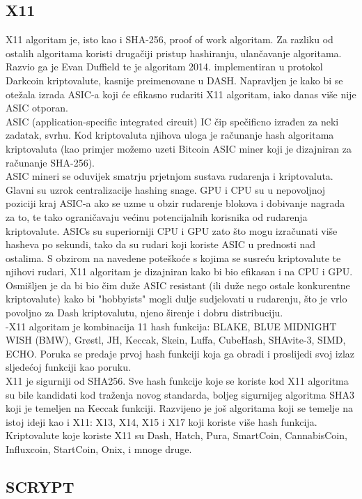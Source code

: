 \documentclass[12pt]{article}
\providecommand\phantomsection{}
\begin{document}
\pagebreak

\subsection{X11}
X11 algoritam je, isto kao i SHA-256, proof of work algoritam. Za razliku od ostalih algoritama koristi drugačiji pristup hashiranju, ulančavanje algoritama. Razvio ga je Evan Duffield te je algoritam 2014. implementiran u protokol Darkcoin kriptovalute, kasnije preimenovane u DASH.
Napravljen je kako bi se otežala izrada ASIC-a koji će efikasno rudariti X11 algoritam, iako danas više nije ASIC otporan.\\
ASIC (application-specific integrated circuit) IC čip spečificno izrađen za neki zadatak, svrhu. Kod kriptovaluta njihova uloga je računanje hash algoritama kriptovaluta (kao primjer možemo uzeti Bitcoin ASIC miner koji je dizajniran za računanje SHA-256). \\
ASIC mineri se oduvijek smatrju prjetnjom sustava rudarenja i kriptovaluta. Glavni su uzrok centralizacije hashing snage. GPU i CPU su u nepovoljnoj poziciji kraj ASIC-a ako se uzme u obzir rudarenje blokova i dobivanje nagrada za to, te tako ograničavaju većinu potencijalnih korisnika od rudarenja kriptovalute. 
ASICs su superiorniji CPU i GPU zato što mogu izračunati više hasheva po sekundi, tako da su rudari koji koriste ASIC u prednosti nad ostalima.
S obzirom na navedene poteškoće s kojima se susreću kriptovalute te njihovi rudari, X11 algoritam je dizajniran kako bi bio efikasan i na CPU i GPU. Osmišljen je da bi bio čim duže ASIC resistant (ili duže nego ostale konkurentne kriptovalute) kako bi "hobbyists" mogli dulje sudjelovati u rudarenju, što je vrlo povoljno za Dash kriptovalutu, njeno širenje i dobru distribuciju. \\  
-X11 algoritam je kombinacija 11 hash funkcija: BLAKE, BLUE MIDNIGHT WISH (BMW), Grøstl, JH, Keccak, Skein, Luffa, CubeHash, SHAvite-3, SIMD, ECHO. Poruka se predaje prvoj hash funkciji koja ga obradi i proslijedi svoj izlaz sljedećoj funkciji kao poruku.\\
X11 je sigurniji od SHA256. Sve hash funkcije koje se koriste kod X11 algoritma su bile kandidati kod traženja novog standarda, boljeg sigurnijeg algoritma SHA3 koji je temeljen na Keccak funkciji.
Razvijeno je još algoritama koji se temelje na istoj ideji kao i X11: X13, X14, X15 i X17 koji koriste više hash funkcija.\\
Kriptovalute koje koriste X11 su Dash, Hatch, Pura, SmartCoin, CannabisCoin, Influxcoin, StartCoin, Onix, i mnoge druge.\cite{x11-description}


\pagebreak
\subsection{SCRYPT}


\phantomsection
{}

\pagebreak


\phantomsection
{}




	
\end{document}
